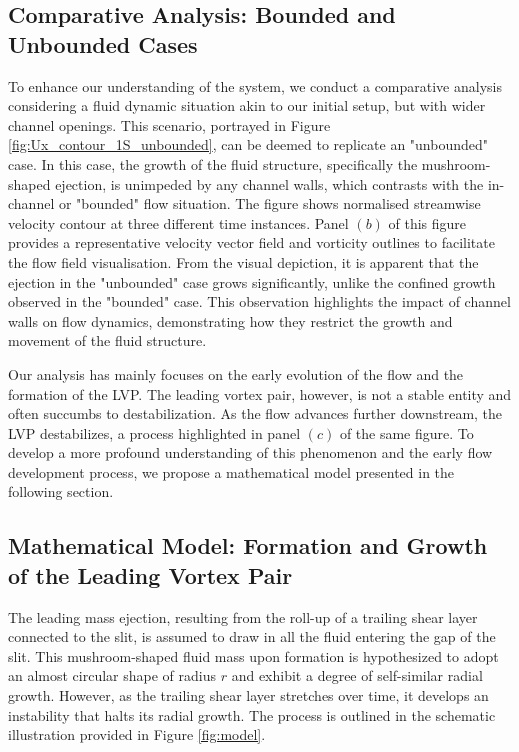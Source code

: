 \documentclass[final,3p,times,authoryear]{elsarticle}
\begin{document}
\subsection{Comparative Analysis: Bounded and Unbounded Cases}\label{sec:comp_analysis}

To enhance our understanding of the system, we conduct a comparative analysis considering a fluid dynamic situation akin to our initial setup, but with wider channel openings. This scenario, portrayed in Figure \ref{fig:Ux_contour_1S_unbounded}, can be deemed to replicate an "unbounded" case. In this case, the growth of the fluid structure, specifically the mushroom-shaped ejection, is unimpeded by any channel walls, which contrasts with the in-channel or "bounded" flow situation. The figure shows normalised streamwise velocity contour at three different time instances. Panel $(b)$ of this figure provides a representative velocity vector field and vorticity outlines to facilitate the flow field visualisation. From the visual depiction, it is apparent that the ejection in the "unbounded" case grows significantly, unlike the confined growth observed in the "bounded" case. This observation highlights the impact of channel walls on flow dynamics, demonstrating how they restrict the growth and movement of the fluid structure.

Our analysis has mainly focuses on the early evolution of the flow and the formation of the LVP. The leading vortex pair, however, is not a stable entity and often succumbs to destabilization. As the flow advances further downstream, the LVP destabilizes, a process highlighted in panel $(c)$ of the same figure. To develop a more profound understanding of this phenomenon and the early flow development process, we propose a mathematical model presented in the following section.

\subsection{Mathematical Model: Formation and Growth of the Leading Vortex Pair}

 The leading mass ejection, resulting from the roll-up of a trailing shear layer connected to the slit, is assumed to draw in all the fluid entering the gap of the slit. This mushroom-shaped fluid mass upon formation is hypothesized to adopt an almost circular shape of radius $r$ and exhibit a degree of self-similar radial growth. However, as the trailing shear layer stretches over time, it develops an instability that halts its radial growth. The process is outlined in the schematic illustration provided in Figure \ref{fig:model}.
\end{document}
